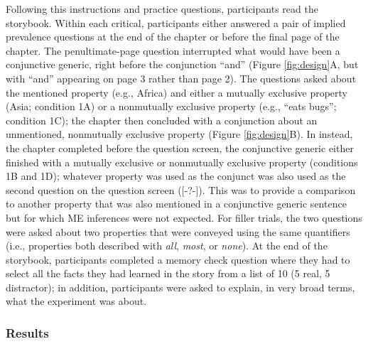 \documentclass[10pt,letterpaper]{article}
\newcommand{\mh}[1]{{\textcolor{Blue}{[mh: #1]}}}
\newcommand{\red}[1]{{\textcolor{Red}{#1}}}
\begin{document}
Following this instructions and practice questions, participants read the storybook.
Within each critical, participants either answered a pair of implied prevalence questions at the end of the chapter or before the final page of the chapter.
The penultimate-page question interrupted what would have been a conjunctive generic, right before the conjunction ``and'' (Figure \ref{fig:design}A, but with ``and'' appearing on page 3 rather than page 2). 
The questions asked about the mentioned property (e.g., Africa) and either a mutually exclusive property (Asia; condition 1A) or a nonmutually exclusive property (e.g., ``eats bugs''; condition 1C); the chapter then concluded with a conjunction about an unmentioned, nonmutually exclusive property (Figure \ref{fig:design}B).
In instead, the chapter completed before the question screen, the conjunctive generic either finished with a mutually exclusive or nonmutually exclusive property (conditions 1B and 1D); whatever property was used as the conjunct was also used as the second question on the question screen ([-?-]).
This was to provide a comparison to another property that was also mentioned in a conjunctive generic sentence but for which ME inferences were not expected.
For filler trials, the two questions were asked about two properties that were conveyed using the same quantifiers (i.e., properties both described with \emph{all}, \emph{most}, or \emph{none}).
At the end of the storybook, participants completed a memory check question where they had to select all the facts they had learned in the story from a list of 10 (5 real, 5 distractor); in addition, participants were asked to explain, in very broad terms, what the experiment was about.



\subsubsection{Results}

\end{document}
